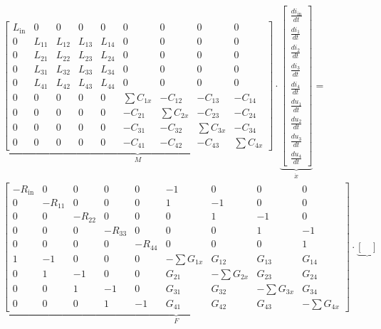 \begin{refsection}
{\footnotesize 
\begin{align}
			&
			\underbrace{\begin{bmatrix}
			L_\mathrm{in}&0&0&0&0 & 0&0&0&0 \\
			0&L_{11}&L_{12}&L_{13}&L_{14} & 0&0&0&0 \\
			0&L_{21}&L_{22}&L_{23}&L_{24} & 0&0&0&0 \\
			0&L_{31}&L_{32}&L_{33}&L_{34} & 0&0&0&0 \\
			0&L_{41}&L_{42}&L_{43}&L_{44} & 0&0&0&0 \\
			0&0&0&0&0 & \sum{C_{1x}}&-C_{12}&-C_{13}&-C_{14} \\
			0&0&0&0&0 & -C_{21}&\sum{C_{2x}}&-C_{23}&-C_{24} \\
			0&0&0&0&0 & -C_{31}&-C_{32}&\sum{C_{3x}}&-C_{34} \\
			0&0&0&0&0 & -C_{41}&-C_{42}&-C_{43}&\sum{C_{4x}}
			    \end{bmatrix}}_{\text{$M$}}
			\cdot
			\underbrace{\begin{bmatrix}
			\frac{di_\mathrm{in}}{dt} \\
			\frac{di_1}{dt} \\
			\frac{di_2}{dt} \\
			\frac{di_3}{dt} \\
			\frac{di_4}{dt} \\
			\frac{du_1}{dt} \\
			\frac{du_2}{dt} \\
			\frac{du_3}{dt} \\
			\frac{du_4}{dt}
			\end{bmatrix}}_{\text{$\dot{x}$}}
			= \nonumber \\
			&
			\underbrace{\begin{bmatrix}
			-R_\mathrm{in}&0&0&0&0 & -1&0&0&0 \\
			0&-R_{11}&0&0&0 & 1&-1&0&0 \\
			0&0&-R_{22}&0&0 & 0&1&-1&0 \\
			0&0&0&-R_{33}&0 & 0&0&1&-1 \\
			0&0&0&0&-R_{44} & 0&0&0&1 \\
			1&-1&0&0&0 & -\sum G_{1x}&G_{12}&G_{13}&G_{14} \\
			0&1&-1&0&0 & G_{21} &- \sum G_{2x}& G_{23}& G_{24} \\
			0&0&1&-1&0 & G_{31} & G_{32} &-\sum G_{3x}&G_{34} \\
			0&0&0&1&-1 & G_{41}&G_{42}&G_{43}&-\sum G_{4x}
			\end{bmatrix}}_{\text{$F$}}
			\cdot
			\underbrace{\begin{bmatrix}

\end{bmatrix}}
\end{align}}
\end{refsection}
